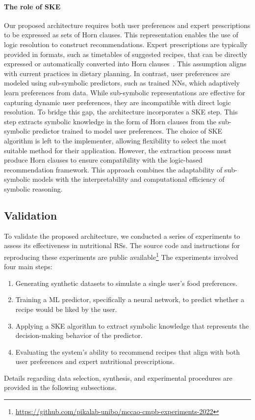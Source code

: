 \paragraph{The role of \gls{SKE}}\label{par:the-role-of-ske}
%
Our proposed architecture requires both user preferences and expert prescriptions to be expressed as sets of Horn clauses.
%
This representation enables the use of logic resolution to construct recommendations.
%
Expert prescriptions are typically provided in formats, such as timetables of suggested recipes, that can be directly expressed or automatically converted into Horn clauses~\cite{DBLP:journals/jcss/Makowsky87}.
%
This assumption aligns with current practices in dietary planning.
%
In contrast, user preferences are modeled using sub-symbolic predictors, such as trained \glspl{NN}, which adaptively learn preferences from data.
%
While sub-symbolic representations are effective for capturing dynamic user preferences, they are incompatible with direct logic resolution.
%
To bridge this gap, the architecture incorporates a \gls{SKE} step.
%
This step extracts symbolic knowledge in the form of Horn clauses from the sub-symbolic predictor trained to model user preferences.
%
The choice of \gls{SKE} algorithm is left to the implementer, allowing flexibility to select the most suitable method for their application.
%
However, the extraction process must produce Horn clauses to ensure compatibility with the logic-based recommendation framework.
%
This approach combines the adaptability of sub-symbolic models with the interpretability and computational efficiency of symbolic reasoning.


\subsection{Validation}\label{subsec:validation-ske-nutrition}
%
To validate the proposed architecture, we conducted a series of experiments to assess its effectiveness in nutritional \glspl{RS}.
%
The source code and instructions for reproducing these experiments are public available\footnote{\url{https://github.com/pikalab-unibo/mccao-cmpb-experiments-2022}}
%
The experiments involved four main steps:
%
\begin{enumerate}
  \item Generating synthetic datasets to simulate a single user's food preferences.
  \item Training a \gls{ML} predictor, specifically a neural network, to predict whether a recipe would be liked by the user.
  \item Applying a \gls{SKE} algorithm to extract symbolic knowledge that represents the decision-making behavior of the predictor.
  \item Evaluating the system's ability to recommend recipes that align with both user preferences and expert nutritional prescriptions.
\end{enumerate}
%
Details regarding data selection, synthesis, and experimental procedures are provided in the following subsections.

